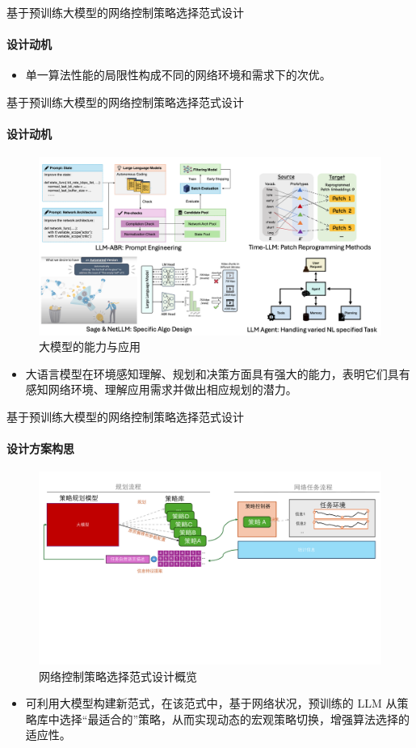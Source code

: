 \documentclass{beamer}
\begin{document}
\begin{frame}[fragile]{基于预训练大模型的网络控制策略选择范式设计}
\framesubtitle{设计动机}

\begin{itemize}
    \item 单一算法性能的局限性构成不同的网络环境和需求下的次优。
\end{itemize}

\end{frame}

\begin{frame}[fragile]{基于预训练大模型的网络控制策略选择范式设计}
\framesubtitle{设计动机}
\begin{figure}
    \centering
    \includegraphics[width=0.6\linewidth]{figures/截屏2024-12-02 16.28.42.png}
    \caption{大模型的能力与应用}
    \label{fig:enter-label}
\end{figure}
\begin{itemize}
    \item 大语言模型在环境感知理解、规划和决策方面具有强大的能力，表明它们具有感知网络环境、理解应用需求并做出相应规划的潜力。
\end{itemize}


\end{frame}


\begin{frame}[fragile]{基于预训练大模型的网络控制策略选择范式设计}
\framesubtitle{设计方案构思}

\begin{figure} [ht]
\centering
\includegraphics[width=\textwidth]{figures/作图.pdf} 
\caption{网络控制策略选择范式设计概览}
\label{fig_llmcc_design}
\end{figure}
\begin{itemize}
    \item 可利用大模型构建新范式，在该范式中，基于网络状况，预训练的 LLM 从策略库中选择“最适合的”策略，从而实现动态的宏观策略切换，增强算法选择的适应性。
\end{itemize}
\end{frame}
\end{document}
